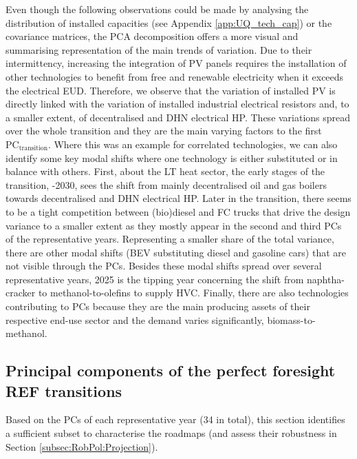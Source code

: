 Even though the following observations could be made by analysing the distribution of installed capacities (see Appendix \ref{app:UQ_tech_cap}) or the covariance matrices, the \gls{PCA} decomposition offers a more visual and summarising representation of the main trends of variation. Due to their intermittency, increasing the integration of \gls{PV} panels requires the installation of other technologies to benefit from free and renewable electricity when it exceeds the electrical \gls{EUD}. Therefore, we observe that the variation of installed \gls{PV} is directly linked with the variation of installed industrial electrical resistors and, to a smaller extent, of decentralised and \gls{DHN} electrical \gls{HP}. These variations spread over the whole transition and they are the main varying factors to the first $\text{PC}_{\text{transition}}$. Where this was an example for correlated technologies, we can also identify some key modal shifts where one technology is either substituted or in balance with others. First, about the \gls{LT} heat sector, the early stages of the transition, -2030, sees the shift from mainly decentralised oil and gas boilers towards decentralised and \gls{DHN} electrical \gls{HP}. Later in the transition, there seems to be a tight competition between (bio)diesel and \gls{FC} trucks that drive the design variance to a smaller extent as they mostly appear in the second and third \gls{PCs} of the representative years. Representing a smaller share of the total variance, there are other modal shifts (\eg \gls{BEV} substituting diesel and gasoline cars) that are not visible through the \gls{PCs}. Besides these modal shifts spread over several representative years, 2025 is the tipping year concerning the shift from naphtha-cracker to methanol-to-olefins to supply \gls{HVC}. Finally, there are also technologies contributing to \gls{PCs} because they are the main producing assets of their respective end-use sector and the demand varies significantly, \eg biomass-to-methanol.

\subsection{Principal components of the perfect foresight REF transitions}
\label{subsec:RobPol:PC_transition}
Based on the \gls{PCs} of each representative year (34 in total), this section identifies a sufficient subset to characterise the roadmaps (and assess their robustness in Section \ref{subsec:RobPol:Projection}).

